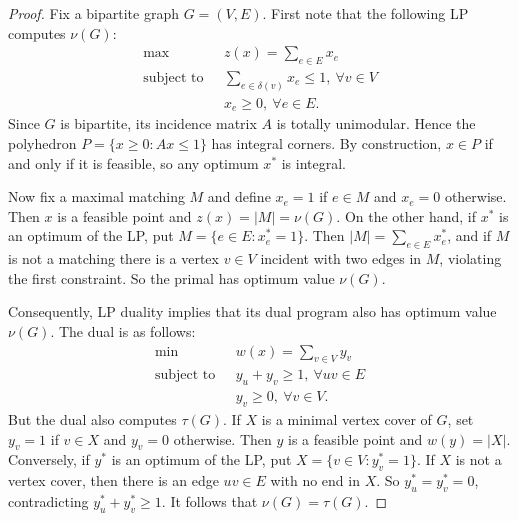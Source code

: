 \begin{proof}
Fix a bipartite graph \( G = (V, E) \). First note that the following LP computes \( \nu (G) \):
\begin{align*}
    \text{max} \ \ \ & z(x) = \sum_{e \in E}^{} x_{e}  \\
    \text{subject to} \ \ \ & \sum_{e \in \delta (v) }^{} x_{e} \leq 1, \ \forall v \in V \\
			    & x_{e} \geq 0, \ \forall e \in E.
\end{align*}
Since \( G \) is bipartite, its incidence matrix \( A \) is totally unimodular. Hence the polyhedron \( P = \{ x \geq 0 : Ax \leq 1 \}  \) has integral corners. By construction, \( x \in P \) if and only if it is feasible, so any optimum \( x^{\ast}  \) is integral.

Now fix a maximal matching \( M \) and define \( x_{e} = 1 \) if \( e \in M \) and \( x_{e} = 0 \) otherwise. Then \( x \) is a feasible point and \( z(x) = |M| = \nu (G) \). On the other hand, if \( x^{\ast}  \) is an optimum of the LP, put \( M = \{ e \in E : x^{\ast} _{e} = 1 \}  \). Then \( |M| = \sum_{e \in E}^{} x^{\ast} _{e}  \), and if \( M \) is not a matching there is a vertex \( v \in V \) incident with two edges in \( M \), violating the first constraint. So the primal has optimum value \( \nu (G) \).

Consequently, LP duality implies that its dual program also has optimum value \( \nu (G) \). The dual is as follows:
\begin{align*}
    \text{min} \ \ \ & w(x) = \sum_{v \in V}^{} y_{v}   \\
    \text{subject to} \ \ \ & y_{u} + y_{v} \geq 1, \ \forall uv \in E \\
			    & y_{v} \geq 0, \ \forall v \in V.
\end{align*}
But the dual also computes \( \tau (G) \). If \( X \) is a minimal vertex cover of \( G \), set \( y_{v} = 1 \) if \( v \in X \) and \( y_{v} = 0 \) otherwise. Then \( y \) is a feasible point and \( w(y) = |X| \). Conversely, if \( y^{\ast}  \) is an optimum of the LP, put \( X = \{ v \in V : y^{\ast}_{v} = 1 \}  \). If \( X \) is not a vertex cover, then there is an edge \( uv \in E \) with no end in \( X \). So \( y^{\ast} _{u} = y^{\ast} _{v} = 0  \), contradicting \( y^{\ast}_{u} + y^{\ast} _{v} \geq 1  \). It follows that \( \nu (G) = \tau (G) \).
\end{proof}
